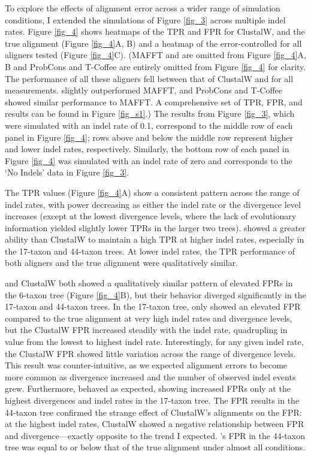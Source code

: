 To explore the effects of alignment error across a wider range of
simulation conditions, I extended the simulations of Figure
\ref{fig_3} across multiple indel rates. Figure \ref{fig_4} shows
heatmaps of the TPR and FPR for ClustalW, \prankc and the true
alignment (Figure \ref{fig_4}A, B) and a heatmap of the
error-controlled \tpr for all aligners tested (Figure \ref{fig_4}C).
(MAFFT and \pranka are omitted from Figure \ref{fig_4}A, B and
ProbCons and T-Coffee are entirely omitted from Figure \ref{fig_4} for
clarity. The performance of all these aligners fell between that of
ClustalW and \prankc for all measurements. \pranka slightly
outperformed MAFFT, and ProbCons and T-Coffee showed similar
performance to MAFFT. A comprehensive set of TPR, FPR, and \tpr
results can be found in Figure \ref{fig_s1}.) The results from Figure
\ref{fig_3}, which were simulated with an indel rate of 0.1,
correspond to the middle row of each panel in Figure \ref{fig_4}; rows
above and below the middle row represent higher and lower indel rates,
respectively. Similarly, the bottom row of each panel in Figure
\ref{fig_4} was simulated with an indel rate of zero and corresponds
to the `No Indels' data in Figure \ref{fig_3}.

The TPR values (Figure \ref{fig_4}A) show a consistent pattern
across the range of indel rates, with power decreasing as either the
indel rate or the divergence level increases (except at the lowest
divergence levels, where the lack of evolutionary information yielded
slightly lower TPRs in the larger two trees). \prankc{} showed a
greater ability than ClustalW to maintain a high TPR at higher indel
rates, especially in the 17-taxon and 44-taxon trees. At lower indel
rates, the TPR performance of both aligners and the true alignment
were qualitatively similar.

\prankc{} and ClustalW both showed a qualitatively similar pattern of
elevated FPRs in the 6-taxon tree (Figure \ref{fig_4}B), but their
behavior diverged significantly in the 17-taxon and 44-taxon trees. In
the 17-taxon tree, \prankc{} only showed an elevated FPR compared to
the true alignment at very high indel rates and divergence levels, but
the ClustalW FPR increased steadily with the indel rate, quadrupling
in value from the lowest to highest indel rate. Interestingly, for any
given indel rate, the ClustalW FPR showed little variation across the
range of divergence levels. This result was counter-intuitive, as we
expected alignment errors to become more common as divergence
increased and the number of observed indel events grew. Furthermore,
\prankc{} behaved as expected, showing increased
FPRs only at the highest divergences and indel rates in the 17-taxon
tree. The FPR results in the 44-taxon tree confirmed the strange
effect of ClustalW's alignments on the \sw FPR: at the highest indel
rates, ClustalW showed a negative relationship between FPR and
divergence---exactly opposite to the trend I expected. \prankc{}'s
FPR in the 44-taxon tree was equal to or below that of the true
alignment under almost all conditions.

